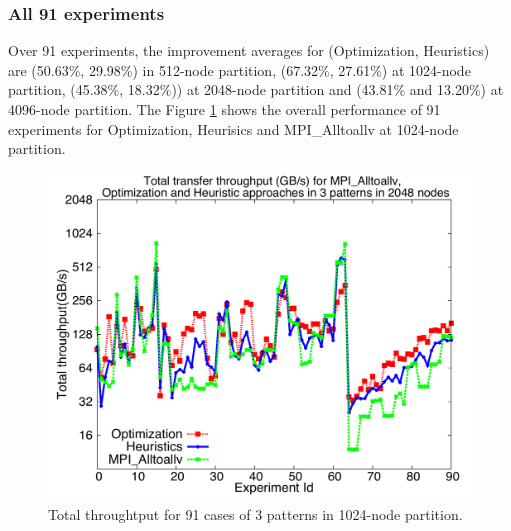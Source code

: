 \subsubsection{All 91 experiments}

Over 91 experiments, the improvement averages for (Optimization, Heuristics)  are (50.63\%, 29.98\%) in 512-node partition, (67.32\%, 27.61\%) at 1024-node partition, (45.38\%, 18.32\%)) at 2048-node partition and (43.81\% and 13.20\%) at 4096-node partition. The Figure \ref{fig:alltests_1k} shows the overall performance of 91 experiments for Optimization, Heurisics and MPI\_Alltoallv at 1024-node partition.

\begin{figure}[!htb]
\vspace{-0.1in}
\centering
\includegraphics[scale=0.30]{figures/alltests_1k.pdf}
\vspace{-0.1in}
\caption{Total throughtput for 91 cases of 3 patterns in 1024-node partition.}
\vspace{-0.1in}
\label{fig:alltests_1k}
\end{figure}
